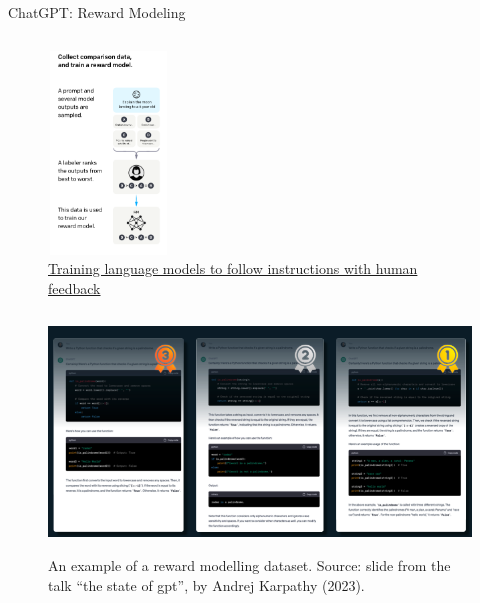 \documentclass[9pt]{beamer}
\begin{document}
\begin{frame}{ChatGPT: Reward Modeling}
    \begin{column}{0.40\textwidth}
        \begin{figure}
            \centering
            \includegraphics[width = 3.2cm, height=5.4cm]{img/sft-chatgpt-rm.png}
            \caption{\href{phttps://arxiv.org/pdf/2106.09685.pdf}{Training language models to follow instructions with human feedback}}
            \label{fig:enter-label}
        \end{figure}
    \end{column}
    \begin{column}{0.50\textwidth}
        \begin{figure}
            \centering
            \includegraphics[width=\textwidth]{img/sft-chatgpt-upvotes-ranking.png}
            \label{fig:enter-label}
            \caption{An example of a reward modelling dataset. Source: slide from the talk ``the state of gpt'', by Andrej Karpathy (2023).}
        \end{figure}
    \end{column}
\end{frame}
\end{document}
